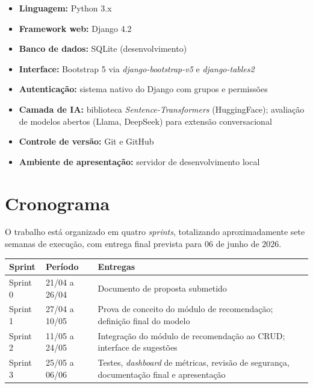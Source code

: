 \begin{itemize}
    \item \textbf{Linguagem:} Python 3.x
    \item \textbf{Framework web:} Django 4.2
    \item \textbf{Banco de dados:} SQLite (desenvolvimento)
    \item \textbf{Interface:} Bootstrap 5 via \textit{django-bootstrap-v5} e \textit{django-tables2}
    \item \textbf{Autenticação:} sistema nativo do Django com grupos e permissões
    \item \textbf{Camada de IA:} biblioteca \textit{Sentence-Transformers} (HuggingFace); avaliação de modelos abertos (Llama, DeepSeek) para extensão conversacional
    \item \textbf{Controle de versão:} Git e GitHub
    \item \textbf{Ambiente de apresentação:} servidor de desenvolvimento local
\end{itemize}

\section{Cronograma}

O trabalho está organizado em quatro \textit{sprints}, totalizando aproximadamente sete semanas de execução, com entrega final prevista para 06 de junho de 2026.

\vspace{0.3cm}

\begin{center}
\begin{tabularx}{\textwidth}{@{} l l X @{}}
\toprule
\textbf{Sprint} & \textbf{Período} & \textbf{Entregas} \\
\midrule
Sprint 0 & 21/04 a 26/04 & Documento de proposta submetido \\
Sprint 1 & 27/04 a 10/05 & Prova de conceito do módulo de recomendação; definição final do modelo \\
Sprint 2 & 11/05 a 24/05 & Integração do módulo de recomendação ao CRUD; interface de sugestões \\
Sprint 3 & 25/05 a 06/06 & Testes, \textit{dashboard} de métricas, revisão de segurança, documentação final e apresentação \\
\bottomrule
\end{tabularx}
\end{center}


